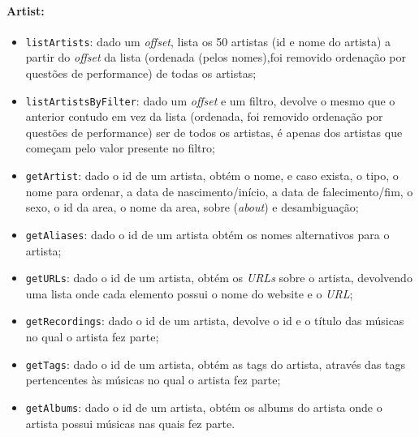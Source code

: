 \documentclass{article}
\begin{document}
\paragraph{\textbf{Artist:}}
    \begin{itemize}
        \item \texttt{listArtists}: dado um \textit{offset}, lista os 50 artistas (id e nome do artista) a partir do \textit{offset} da lista (ordenada (pelos nomes),foi removido ordenação por questões de performance) de todas os artistas;
        \item \texttt{listArtistsByFilter}: dado um \textit{offset} e um filtro, devolve o mesmo que o anterior contudo em vez da lista (ordenada, foi removido ordenação por questões de performance) ser de todos os artistas, é apenas dos artistas que começam pelo valor presente no filtro;
        \item \texttt{getArtist}: dado o id de um artista, obtém o nome, e caso exista, o tipo, o nome para ordenar, a data de nascimento/início, a data de falecimento/fim, o sexo, o id da area, o nome da area, sobre (\textit{about}) e desambiguação;
        \item \texttt{getAliases}: dado o id de um artista obtém os nomes alternativos para o artista;
        \item \texttt{getURLs}: dado o id de um artista, obtém os \textit{URLs} sobre o artista, devolvendo uma lista onde cada elemento possui o nome do website e o \textit{URL};
        \item \texttt{getRecordings}: dado o id de um artista, devolve o id e o título das músicas no qual o artista fez parte;
        \item \texttt{getTags}: dado o id de um artista, obtém as tags do artista, através das tags pertencentes às músicas no qual o artista fez parte;
        \item \texttt{getAlbums}: dado o id de um artista, obtém os albums do artista onde o artista possui músicas nas quais fez parte.
    \end{itemize}
\end{document}

